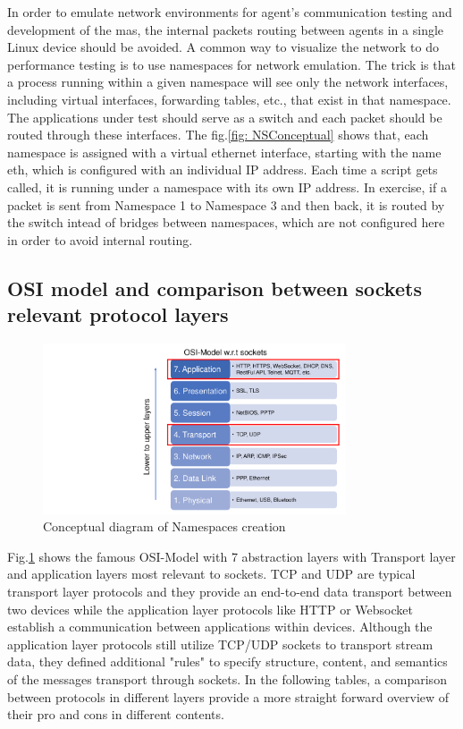 In order to emulate network environments for agent's communication testing and development of the \gls{mas}, the internal packets routing between agents in a single Linux device should be avoided. A common way to visualize the network to do performance testing is to use namespaces for network emulation. The trick is that a process running within a given namespace will see only the network interfaces, including virtual interfaces, forwarding tables, etc., that exist in that namespace. The applications under test should serve as a switch and each packet should be routed through these interfaces. The fig.\ref{fig: NSConceptual} shows that, each namespace is assigned with a virtual ethernet interface, starting with the name eth, which is configured with an individual IP address. Each time a script gets called, it is running under a namespace with its own IP address. In exercise, if a packet is sent from Namespace 1 to Namespace 3 and then back, it is routed by the switch intead of bridges between namespaces, which are not configured here in order to avoid internal routing.

\subsection{OSI model and comparison between sockets relevant protocol layers}
\begin{figure}[htbp]
\includegraphics[width=0.8\textwidth]{figures/OSI.pdf}
\centering
\caption{Conceptual diagram of Namespaces creation\label{fig: OSI}}
\end{figure}

Fig.\ref{fig: OSI} shows the famous OSI-Model with 7 abstraction layers with Transport layer and application layers most relevant to sockets. 
TCP and UDP are typical transport layer protocols and they provide an end-to-end data transport between two devices while the application layer protocols like HTTP or Websocket establish a communication between applications within devices. 
Although the application layer protocols still utilize TCP/UDP sockets to transport stream data, they defined additional "rules" to specify structure, content, and semantics of the messages transport through sockets. 
In the following tables, a comparison between protocols in different layers provide a more straight forward overview of their pro and cons in different contents.


